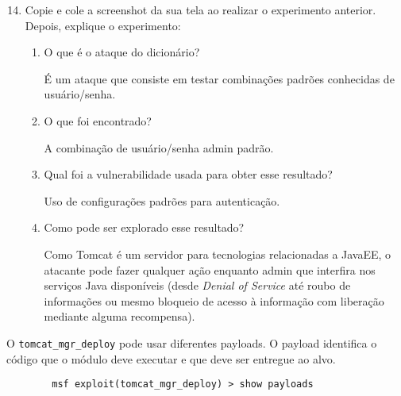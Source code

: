 \documentclass{article}
\newcommand{\todo}[1]{{\color{red}{#1}}}
\newcommand{\code}[1]{\texttt{#1}}
\begin{document}
    \begin{superframe}
        \begin{enumerate}
            \setcounter{enumi}{13}
            \item Copie e cole a screenshot da sua tela ao realizar o
                experimento anterior. Depois, explique o experimento:

                \todo{Feed me images >:)}

                \begin{enumerate}
                    \item O que é o ataque do dicionário?

                        É um ataque que consiste em testar combinações padrões
                        conhecidas de usuário/senha.

                    \item O que foi encontrado?

                        A combinação de usuário/senha admin padrão.

                    \item Qual foi a vulnerabilidade usada para obter esse
                        resultado?

                        Uso de configurações padrões para autenticação.

                    \item Como pode ser explorado esse resultado?

                        Como Tomcat é um servidor para tecnologias relacionadas
                        a JavaEE, o atacante pode fazer qualquer ação enquanto
                        admin que interfira nos serviços Java disponíveis
                        (desde \textit{Denial of Service} até roubo de
                        informações ou mesmo bloqueio de acesso à informação
                        com liberação mediante alguma recompensa).
                \end{enumerate}
        \end{enumerate}
    \end{superframe}

    O \code{tomcat\_mgr\_deploy} pode usar diferentes payloads. O payload
    identifica o código que o módulo deve executar e que deve ser entregue ao
    alvo.

    \begin{verbatim}
        msf exploit(tomcat_mgr_deploy) > show payloads
    \end{verbatim}
\end{document}
